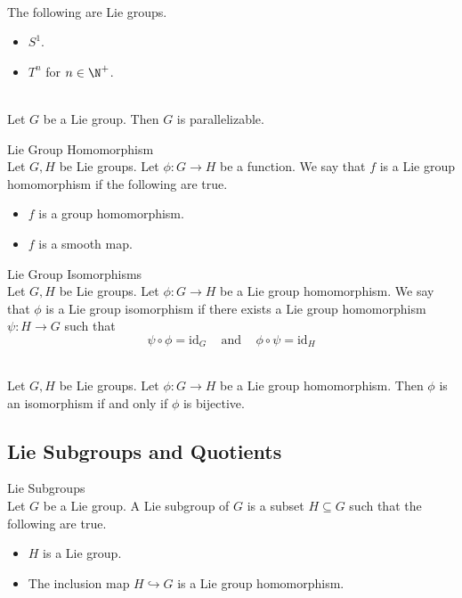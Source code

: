 \documentclass[a4paper]{article}
\begin{document}
\begin{eg}{}{}\\
The following are Lie groups. 
\begin{itemize}
\item $S^1$. 
\item $T^n$ for $n\in\N^+$. 
\end{itemize}
\end{eg}

\begin{prp}{}{}\\
Let $G$ be a Lie group. Then $G$ is parallelizable. 
\end{prp}

\begin{defn}{Lie Group Homomorphism}{}\\
Let $G,H$ be Lie groups. Let $\phi:G\to H$ be a function. We say that $f$ is a Lie group homomorphism if the following are true. 
\begin{itemize}
\item $f$ is a group homomorphism. 
\item $f$ is a smooth map. 
\end{itemize}
\end{defn}

\begin{defn}{Lie Group Isomorphisms}{}\\
Let $G,H$ be Lie groups. Let $\phi:G\to H$ be a Lie group homomorphism. We say that $\phi$ is a Lie group isomorphism if there exists a Lie group homomorphism $\psi:H\to G$ such that $$\psi\circ\phi=\text{id}_G\;\;\;\text{ and }\;\;\;\phi\circ\psi=\text{id}_H$$
\end{defn}

\begin{lmm}{}{}\\
Let $G,H$ be Lie groups. Let $\phi:G\to H$ be a Lie group homomorphism. Then $\phi$ is an isomorphism if and only if $\phi$ is bijective. 
\end{lmm}

\subsection{Lie Subgroups and Quotients}
\begin{defn}{Lie Subgroups}{}\\
Let $G$ be a Lie group. A Lie subgroup of $G$ is a subset $H\subseteq G$ such that the following are true. 
\begin{itemize}
\item $H$ is a Lie group. 
\item The inclusion map $H\hookrightarrow G$ is a Lie group homomorphism. 
\end{itemize}
\end{defn}
\end{document}

